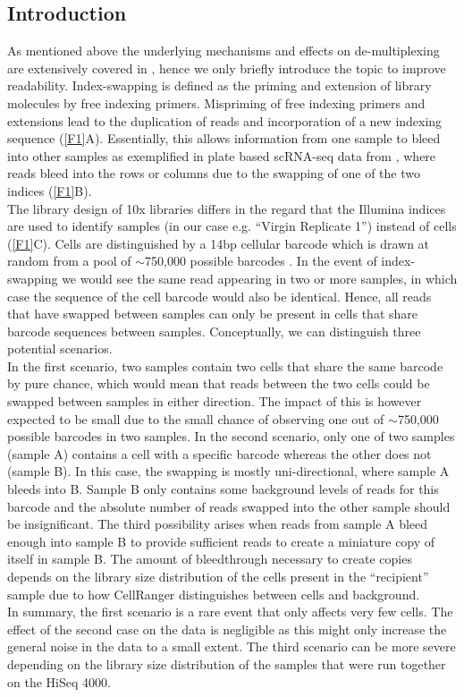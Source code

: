\documentclass{article}
\begin{document}
\subsection*{Introduction}
As mentioned above the underlying mechanisms and effects on de-multiplexing are extensively covered in \autocite{Sinha2017}, hence we only briefly introduce the topic to improve readability.
Index-swapping is defined as the priming and extension of library molecules by free indexing primers.
Mispriming of free indexing primers and extensions lead to the duplication of reads and incorporation of a new indexing sequence (\autoref{F1}A).
Essentially, this allows information from one sample to bleed into other samples as exemplified in plate based scRNA-seq data from \autocite{Sinha2017}, where reads bleed into the rows or columns due to the swapping of one of the two indices (\autoref{F1}B).\\
The library design of 10x libraries differs in the regard that the Illumina indices are used to identify samples (in our case e.g. ``Virgin Replicate 1'') instead of cells (\autoref{F1}C).
Cells are distinguished by a 14bp cellular barcode which is drawn at random from a pool of $\sim$750,000 possible barcodes \autocite{Zheng2017}.
In the event of index-swapping we would see the same read appearing in two or more samples, in which case the sequence of the cell barcode would also be identical.
Hence, all reads that have swapped between samples can only be present in cells that share barcode sequences between samples.
Conceptually, we can distinguish three potential scenarios.\\
In the first scenario, two samples contain two cells that share the same barcode by pure chance, which would mean that reads between the two cells could be swapped between samples in either direction.
The impact of this is however expected to be small due to the small chance of observing one out of $\sim$750,000 possible barcodes in two samples.
In the second scenario, only one of two samples (sample A) contains a cell with a specific barcode whereas the other does not (sample B).
In this case, the swapping is mostly uni-directional, where sample A bleeds into B.
Sample B only contains some background levels of reads for this barcode and the absolute number of reads swapped into the other sample should be insignificant.
The third possibility arises when reads from sample A bleed enough into sample B to provide sufficient reads to create a miniature copy of itself in sample B.
The amount of bleedthrough necessary to create copies depends on the library size distribution of the cells present in the ``recipient'' sample due to how CellRanger distinguishes between cells and background.\\
In summary, the first scenario is a rare event that only affects very few cells.
The effect of the second case on the data is negligible as this might only increase the general noise in the data to a small extent.
The third scenario can be more severe depending on the library size distribution of the samples that were run together on the HiSeq 4000.
\end{document}
